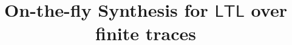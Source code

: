\documentclass[letterpaper]{article} %
\newcommand{\ltl}{\textsf{LTL}\xspace}
\begin{document}
%

\title{On-the-fly Synthesis for $\ltl$ over finite traces}



\iffalse
\author{Jianwen Li, Kristin Y. Rozier\\ Iowa State University\\ Ames, IA, USA\\\{jianwen,kyrozier\}@iastate.edu 
\And Geguang Pu, Yueling Zhang\\ East China Normal University\\ Shanghai, China\\\{ggpu,ylzhang\}@sei.ecnu.edu.cn
\And Moshe Y. Vardi\\ Rice University\\ Houston, TX, USA\\ vardi@cs.rice.edu}
\fi

\maketitle
 


\begin{abstract}

\end{abstract}


%

%

%



%

%






\end{document}
